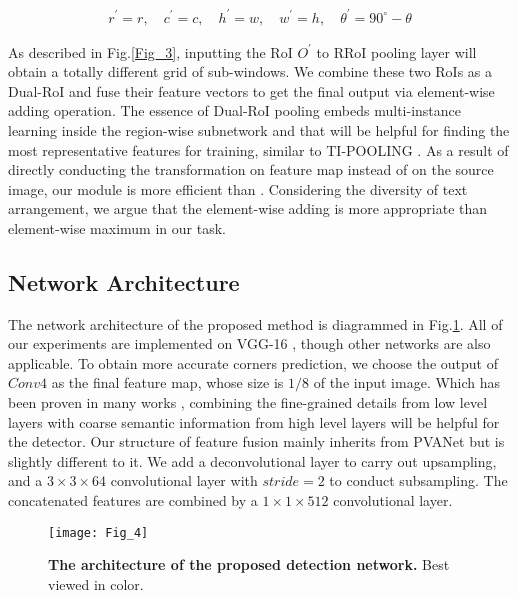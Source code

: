 \documentclass[3p, times]{elsarticle}
\begin{document}
\begin{gather}
r^{'}=r,\quad c^{'}=c,\quad h^{'}=w,\quad w^{'}=h,\quad \theta^{'}=90^{\circ}-\theta
\label{Eq:RoITrans}
\end{gather}

\noindent As described in Fig.\ref{Fig_3}, inputting the RoI $O^{'}$ to RRoI pooling layer will obtain a totally different grid of sub-windows. We combine these two RoIs as a Dual-RoI and fuse their feature vectors to get the final output via element-wise adding operation. The essence of Dual-RoI pooling embeds multi-instance learning \cite{DML2015CVPR} inside the region-wise subnetwork and that will be helpful for finding the most representative features for training, similar to TI-POOLING \cite{TIPOOL2016CVPR}. As a result of directly conducting the transformation on feature map instead of on the source image, our module is more efficient than \cite{TIPOOL2016CVPR}. Considering the diversity of text arrangement, we argue that the element-wise adding is more appropriate than element-wise maximum in our task. 



\subsection{Network Architecture}
The network architecture of the proposed method is diagrammed in Fig.\ref{Fig_4}. All of our experiments are implemented on VGG-16 \cite{VGG2015ICLR}, though other networks are also applicable. To obtain more accurate corners prediction, we choose the output of $Conv4$ as the final feature map, whose size is $1/8$ of the input image. Which has been proven in many works \cite{HYPERNET2016CVPR, PVANET2016ARXIV}, combining the fine-grained details from low level layers with coarse semantic information from high level layers will be helpful for the detector. Our structure of feature fusion mainly inherits from PVANet \cite{PVANET2016ARXIV} but is slightly different to it. We add a deconvolutional layer to carry out upsampling, and a ${3}\times{3}\times{64}$ convolutional layer with $stride=2$ to conduct subsampling. The concatenated features are combined by a ${1}\times{1}\times{512}$ convolutional layer.

\begin{figure}[!htb]
\centering
\texttt{[image: Fig\_4]}
\caption{\textbf{The architecture of the proposed detection network.} Best viewed in color.}
\label{Fig_4}
\end{figure}
\end{document}
